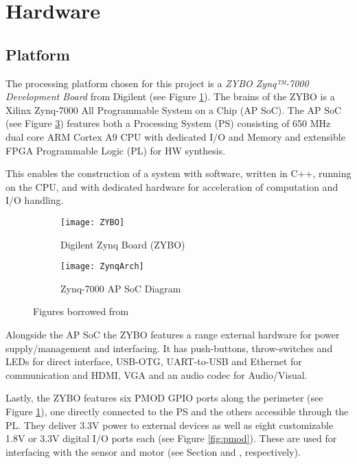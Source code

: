 \documentclass[Main]{subfiles}
\begin{document}
\section{Hardware} %
\label{sec:hardware}

	\subsection{Platform} %
	\label{sub:platform}

		The processing platform chosen for this project is a \emph{ZYBO Zynq™-7000 Development Board} from Digilent (see Figure \ref{fig:ZYBO}).
		The brains of the ZYBO is a Xilinx Zynq-7000 All Programmable System on a Chip (AP SoC).
		The AP SoC (see Figure \ref{fig:ZynqArch}) features both a Processing System (PS) consisting of 650 MHz dual core ARM\textregistered{} Cortex A9 CPU with dedicated I/O and Memory and extensible FPGA Programmable Logic (PL) for HW synthesis.

		This enables the construction of a system with software, written in C++, running on the CPU, and with dedicated hardware for acceleration of computation and I/O handling.
		\begin{figure}[H]
			\centering
			\begin{subfigure}[b]{0.55\linewidth}
				\texttt{[image: ZYBO]}
				\caption{Digilent Zynq Board (ZYBO)}
				\label{fig:ZYBO}
			\end{subfigure}		
			\begin{subfigure}[b]{0.4\linewidth}
				\texttt{[image: ZynqArch]}
				\caption{Zynq-7000 AP SoC Diagram}
				\label{fig:ZynqArch}
			\end{subfigure}
			\caption{Figures borrowed from \cite{Digilent2014}}		
		\end{figure}

		Alongside the AP SoC the ZYBO features a range external hardware for power supply/management and interfacing.
		It has push-buttons, throw-switches and LEDs for direct interface, USB-OTG, UART-to-USB and Ethernet for communication and HDMI, VGA and an audio codec for Audio/Visual.

		Lastly, the ZYBO features six PMOD GPIO ports along the perimeter (see Figure \ref{fig:ZYBO}), one directly connected to the PS and the others accessible through the PL.
		They deliver 3.3V power to external devices as well as eight customizable 1.8V or 3.3V digital I/O ports each (see Figure \ref{fig:pmod}).
		These are used for interfacing with the sensor and motor (see Section  and , respectively).
\end{document}
